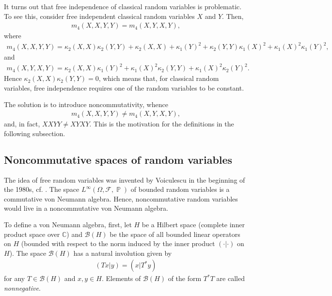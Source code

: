 \documentclass[letterpaper,11pt,oneside,reqno]{amsart}
\numberwithin{equation}{section}
\DeclareMathOperator{\PP}{\mathbb{P}}
\theoremstyle{definition}
\begin{document}
It turns out that free independence of classical random variables is problematic. 
To see this, consider free independent classical random variables $X$ and $Y$. Then, 
\begin{align*}
    m_4(X,X,Y,Y) = m_4(X,Y,X,Y),
\end{align*}
 where 
\begin{align*}
 m_4(X,X,Y,Y)=\kappa_2(X,X)\kappa_2(Y,Y)+\kappa_2(X,X)+\kappa_1(Y)^2 +\kappa_2(Y,Y)\kappa_1(X)^2+\kappa_1(X)^2\kappa_1(Y)^2,
\end{align*}
and
\begin{align*}
 m_4(X,Y,X,Y)=\kappa_2(X,X)\kappa_1(Y)^2+\kappa_1(X)^2\kappa_2(Y,Y)+\kappa_1(X)^2\kappa_2(Y)^2.
\end{align*}
Hence $\kappa_2(X,X)\kappa_2(Y,Y)=0$, which means that, for classical random variables, free independence requires one of the random variables to be constant. 

The solution is to introduce noncommutativity, whence
\begin{align*}
    m_4(X,X,Y,Y) \neq m_4(X,Y,X,Y),
\end{align*}
and, in fact, $XXYY\ne XYXY$.
This is the motivation for the definitions in the following subsection.


\subsection{Noncommutative spaces of random variables} %
\label{sub:free_random_variables}

The idea of free random variables was invented by Voiculescu in the beginning of the 
1980s, cf. \cite{Voiculescu_Free_book}. 
The space $L^\infty(\Omega, \mathcal{F},\PP)$ of bounded random variables 
is a commutative von Neumann algebra. 
Hence, noncommutative random variables would live in a noncommutative von Neumann algebra. 

To define a von Neumann algebra, first, let $H$ be a Hilbert space (complete inner product space over $\mathbb{C}$) and $\mathcal{B}(H)$ be the space of all bounded linear operators on $H$ (bounded with respect to the norm induced by the inner product $(\cdot|\cdot)$ on $H$). The space $\mathcal{B}(H)$ has a natural involution given by 
\begin{align*}
    (Tx|y)=(x|T^*y)
\end{align*}
for any $T\in \mathcal{B}(H)$ and $x,y\in H$. Elements of $\mathcal{B}(H)$
of the form $T^{*}T$ are called \emph{nonnegative}.
\end{document}

